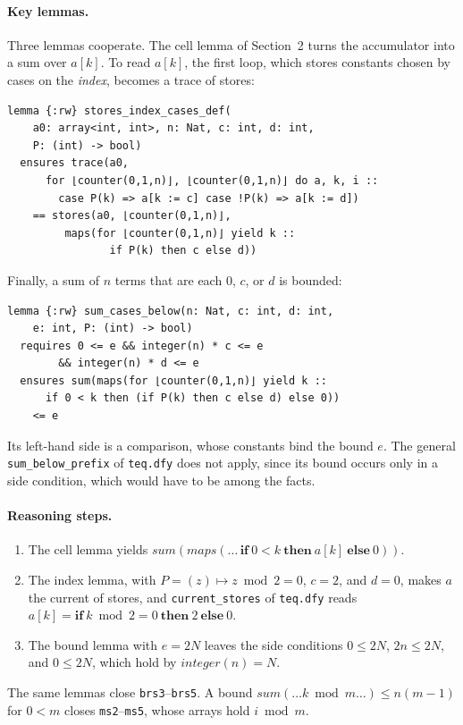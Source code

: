 \documentclass[sigconf,nonacm]{acmart}
\newcommand{\code}[1]{\texttt{#1}}
\begin{document}
\paragraph{Key lemmas.} Three lemmas cooperate. The cell lemma of
Section~2 turns the accumulator into a sum over $a[k]$. To read $a[k]$, the
first loop, which stores constants chosen by cases on the \emph{index}, becomes
a trace of stores:
\begin{lstlisting}[language=dafny]
lemma {:rw} stores_index_cases_def(
    a0: array<int, int>, n: Nat, c: int, d: int,
    P: (int) -> bool)
  ensures trace(a0,
      for ⌊counter(0,1,n)⌋, ⌊counter(0,1,n)⌋ do a, k, i ::
        case P(k) => a[k := c] case !P(k) => a[k := d])
    == stores(a0, ⌊counter(0,1,n)⌋,
         maps(for ⌊counter(0,1,n)⌋ yield k ::
                if P(k) then c else d))
\end{lstlisting}
Finally, a sum of $n$ terms that are each $0$, $c$, or $d$ is bounded:
\begin{lstlisting}[language=dafny]
lemma {:rw} sum_cases_below(n: Nat, c: int, d: int,
    e: int, P: (int) -> bool)
  requires 0 <= e && integer(n) * c <= e
        && integer(n) * d <= e
  ensures sum(maps(for ⌊counter(0,1,n)⌋ yield k ::
      if 0 < k then (if P(k) then c else d) else 0))
    <= e
\end{lstlisting}
Its left-hand side is a comparison, whose constants bind the bound $e$. The
general \code{sum\_below\_prefix} of \code{teq.dfy} does not apply, since its
bound occurs only in a side condition, which would have to be among the facts.

\paragraph{Reasoning steps.}
\begin{enumerate}
\item The cell lemma yields
  $\mathit{sum}(\mathit{maps}(\ldots\,\mathbf{if}~0<k~\mathbf{then}~a[k]~\mathbf{else}~0))$.
\item The index lemma, with $P = (z) \mapsto z \bmod 2 = 0$, $c = 2$, and
  $d = 0$, makes $a$ the current of stores, and \code{current\_stores} of
  \code{teq.dfy} reads
  $a[k] = \mathbf{if}~k \bmod 2 = 0~\mathbf{then}~2~\mathbf{else}~0$.
\item The bound lemma with $e = 2N$ leaves the side conditions $0 \le 2N$,
  $2n \le 2N$, and $0 \le 2N$, which hold by $\mathit{integer}(n) = N$.
\end{enumerate}
The same lemmas close \code{brs3}--\code{brs5}. A bound
$\mathit{sum}(\ldots k \bmod m \ldots) \le n(m-1)$ for $0 < m$ closes
\code{ms2}--\code{ms5}, whose arrays hold $i \bmod m$.
\end{document}
